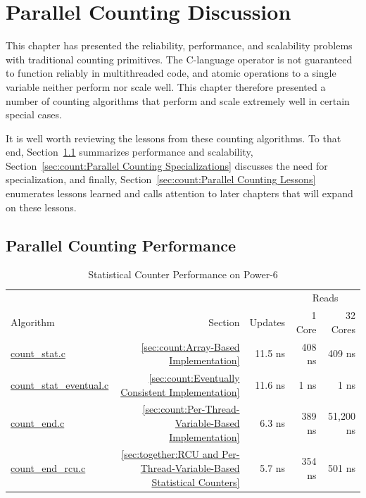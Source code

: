 \section{Parallel Counting Discussion}
\label{sec:count:Parallel Counting Discussion}

This chapter has presented the reliability, performance, and
scalability problems with traditional counting primitives.
The C-language \co{++} operator is not guaranteed to function reliably in
multithreaded code, and atomic operations to a single variable neither
perform nor scale well.
This chapter therefore presented a number of counting algorithms that
perform and scale extremely well in certain special cases.

It is well worth reviewing the lessons from these counting algorithms.
To that end,
Section~\ref{sec:count:Parallel Counting Performance}
summarizes performance and scalability,
Section~\ref{sec:count:Parallel Counting Specializations}
discusses the need for specialization,
and finally,
Section~\ref{sec:count:Parallel Counting Lessons}
enumerates lessons learned and calls attention to later chapters that
will expand on these lessons.

\subsection{Parallel Counting Performance}
\label{sec:count:Parallel Counting Performance}

\begin{table}
\begin{center}
\begin{tabular}{l|r|r|r|r}
	& & & \multicolumn{2}{|c}{Reads} \\
	\cline{4-5}
	Algorithm & Section & Updates & 1 Core & 32 Cores \\
	\hline
	\hline
	\url{count_stat.c} & \ref{sec:count:Array-Based Implementation} &
		11.5 ns & 408 ns & 409 ns \\
	\url{count_stat_eventual.c} & \ref{sec:count:Eventually Consistent Implementation} &
		11.6 ns & 1 ns & 1 ns \\
	\url{count_end.c} & \ref{sec:count:Per-Thread-Variable-Based Implementation} &
		6.3 ns & 389 ns & 51,200 ns \\
	\url{count_end_rcu.c} & \ref{sec:together:RCU and Per-Thread-Variable-Based Statistical Counters} &
		5.7 ns & 354 ns & 501 ns \\
\end{tabular}
\end{center}
\caption{Statistical Counter Performance on Power-6}
\label{tab:count:Statistical Counter Performance on Power-6}
\end{table}

